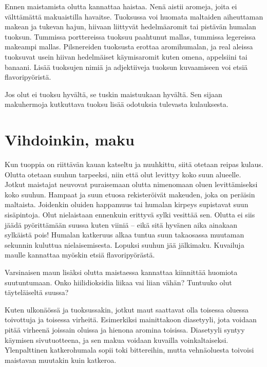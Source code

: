 \documentclass[a4paper,11pt]{report}
\begin{document}
Ennen maistamista olutta kannattaa haistaa. Nenä aistii aromeja, joita ei välttämättä makuaistilla havaitse. Tuoksussa voi huomata maltaiden aiheuttaman makean ja tukevan hajun, hiivaan liittyvät hedelmäaromit tai pistävän humalan tuoksun. Tummissa porttereissa tuoksuu paahtunut mallas, tummissa legereissa makeampi mallas. Pilsnereiden tuoksusta erottaa aromihumalan, ja real aleissa tuoksuvat usein hiivan hedelmäiset käymisaromit kuten omena, appelsiini tai banaani. Lisää tuoksujen nimiä ja adjektiiveja tuoksun kuvaamiseen voi etsiä flavoripyöristä.

Jos olut ei tuoksu hyvältä, se tuskin maistuukaan hyvältä. Sen sijaan makuhermoja kutkuttava tuoksu lisää odotuksia tulevasta kulauksesta.

\section{Vihdoinkin, maku}

Kun tuoppia on riittävän kauan katseltu ja nuuhkittu, siitä otetaan reipas kulaus. Olutta otetaan suuhun tarpeeksi, niin että olut levittyy koko suun alueelle. Jotkut maistajat neuvovat puraisemaan olutta nimenomaan oluen levittämiseksi koko suuhun. Hampaat ja suun etuosa rekisteröivät makeuden, joka on peräisin maltaista. Joidenkin oluiden happamuus tai humalan kirpeys supistavat suun sisäpintoja. Olut nielaistaan ennenkuin erittyvä sylki vesittää sen. Olutta ei siis jäädä pyörittämään suussa kuten viiniä -- eikä sitä hyvänen aika ainakaan sylkäistä pois! Humalan katkeruus alkaa tuntua suun takaosassa muutaman sekunnin kuluttua nielaisemisesta. Lopuksi suuhun jää jälkimaku. Kuvailuja maulle kannattaa myöskin etsiä flavoripyörästä.

Varsinaisen maun lisäksi olutta maistaessa kannattaa kiinnittää huomiota suutuntumaan. Onko hiilidioksidia liikaa vai liian vähän? Tuntuuko olut täyteläiseltä suussa?

Kuten ulkonäössä ja tuoksussakin, jotkut maut saattavat olla toisessa oluessa toivottuja ja toisessa virheitä. Esimerkiksi mainittakoon diasetyyli, jota voidaan pitää virheenä joissain oluissa ja hienona aromina toisissa. Diasetyyli syntyy käymisen sivutuotteena, ja sen makua voidaan kuvailla voinkaltaiseksi. Ylenpalttinen katkerohumala sopii toki bittereihin, mutta vehnäoluesta toivoisi maistavan muutakin kuin katkeroa.
\end{document}
